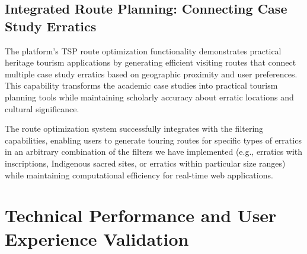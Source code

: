 
\subsection{Integrated Route Planning: Connecting Case Study Erratics}
\label{subsec:integrated_route_planning}

The platform's TSP route optimization functionality demonstrates practical heritage tourism applications by generating efficient visiting routes that connect multiple case study erratics based on geographic proximity and user preferences. This capability transforms the academic case studies into practical tourism planning tools while maintaining scholarly accuracy about erratic locations and cultural significance.


The route optimization system successfully integrates with the filtering capabilities, enabling users to generate touring routes for specific types of erratics in an arbitrary combination of the filters we have implemented (e.g., erratics with inscriptions, Indigenous sacred sites, or erratics within particular size ranges) while maintaining computational efficiency for real-time web applications.

\section{Technical Performance and User Experience Validation}
\label{sec:technical_performance}

